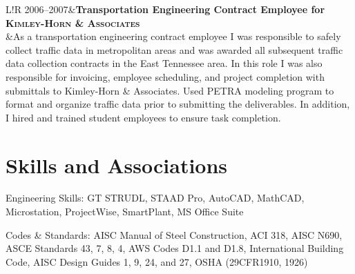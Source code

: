 \documentclass[11pt,letterpaper]{article}
\newcommand\VRule{\color{lightgray}\vrule width 0.5pt}
\begin{document}
\begin{tabular}{L!{\VRule}R}
2006--2007&{\bf Transportation Engineering Contract Employee for \fontsize{12}{12}\textsc{Kimley-Horn \& Associates}}\\
&As a transportation engineering contract employee I was responsible to safely collect traffic data in metropolitan areas and was awarded all subsequent traffic data collection contracts in the East Tennessee area.  In this role I was also responsible for invoicing, employee scheduling, and project completion with submittals to Kimley-Horn \& Associates.  Used PETRA modeling program to format and organize traffic data prior to submitting the deliverables.  In addition, I hired and trained student employees to ensure task completion.
\par\vspace{0.3em} 
\end{tabular}


\section*{Skills and Associations}

\begin{description*}
	\item[Engineering Skills:]
	GT STRUDL, STAAD Pro, AutoCAD, MathCAD, Microstation, ProjectWise, SmartPlant, MS Office Suite
	\\[5pt]
	\item[Codes \& Standards:]
	AISC Manual of Steel Construction, ACI 318, AISC N690, ASCE Standards 43, 7, 8, 4, AWS Codes D1.1 and D1.8, International Building Code, AISC Design Guides 1, 9, 24, and 27, OSHA (29CFR1910, 1926)\\[5pt]
	\end{description*}
\end{document}
